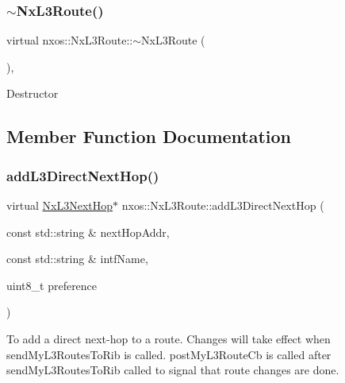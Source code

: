 \subsubsection{\texorpdfstring{$\sim$\+Nx\+L3\+Route()}{~NxL3Route()}}
{\footnotesize\ttfamily virtual nxos\+::\+Nx\+L3\+Route\+::$\sim$\+Nx\+L3\+Route (\begin{DoxyParamCaption}{ }\end{DoxyParamCaption})\hspace{0.3cm}{\ttfamily [inline]}, {\ttfamily [virtual]}}

Destructor 

\subsection{Member Function Documentation}
\mbox{\label{classnxos_1_1_nx_l3_route_a7ae92c958f54c6e85579eb6ef81f30b3}} 
\subsubsection{\texorpdfstring{add\+L3\+Direct\+Next\+Hop()}{addL3DirectNextHop()}}
{\footnotesize\ttfamily virtual \mbox{\hyperlink{classnxos_1_1_nx_l3_next_hop}{Nx\+L3\+Next\+Hop}}$\ast$ nxos\+::\+Nx\+L3\+Route\+::add\+L3\+Direct\+Next\+Hop (\begin{DoxyParamCaption}\item[{const std\+::string \&}]{next\+Hop\+Addr,  }\item[{const std\+::string \&}]{intf\+Name,  }\item[{uint8\+\_\+t}]{preference }\end{DoxyParamCaption})\hspace{0.3cm}{\ttfamily [pure virtual]}}

To add a direct next-\/hop to a route. Changes will take effect when send\+My\+L3\+Routes\+To\+Rib is called. post\+My\+L3\+Route\+Cb is called after send\+My\+L3\+Routes\+To\+Rib called to signal that route changes are done.



